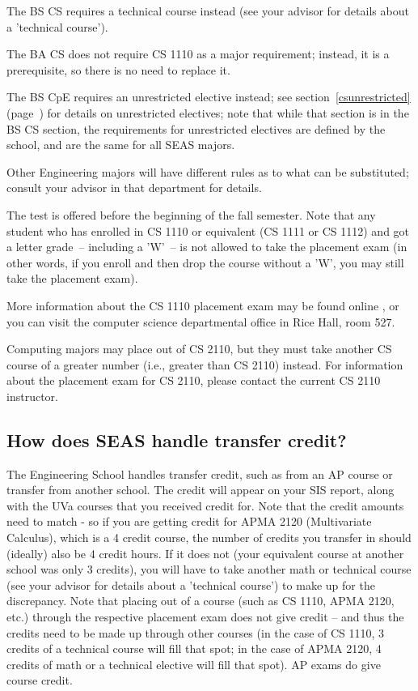 \begin{itemlist}
\item The BS CS requires a technical course instead (see your advisor
for details about a 'technical course').
\item The BA CS does not require CS 1110 as a major requirement;
  instead, it is a prerequisite, so there is no need to replace it.
\item The BS CpE requires an unrestricted elective instead; see
section~\ref{csunrestricted} (page~\pageref{csunrestricted}) for
details on unrestricted electives; note that while that section is in
the BS CS section, the requirements for unrestricted electives are
defined by the school, and are the same for all SEAS majors.
\item Other Engineering majors will have different rules as to what
  can be substituted; consult your advisor in that department for
  details.
\end{itemlist}

The test is offered before the beginning of the fall semester. Note
that any student who has enrolled in CS 1110 or equivalent (CS 1111 or
CS 1112) and got a letter grade~-- including a 'W'~-- is not allowed
to take the placement exam (in other words, if you enroll and then
drop the course without a 'W', you may still take the placement
exam).

More information about the CS 1110 placement exam may be found online
, or you can
visit the computer science departmental office in Rice Hall, room 527.

Computing majors may place out of CS 2110, but they must take another
CS course of a greater number (i.e., greater than CS 2110) instead.
For information about the placement exam for CS 2110, please contact
the current CS 2110 instructor.

\subsection{How does SEAS handle transfer credit?}

The Engineering School handles transfer credit, such as from an AP
course or transfer from another school. The credit will appear on your
SIS report, along with the UVa courses that you received credit
for. Note that the credit amounts need to match - so if you are
getting credit for APMA 2120 (Multivariate Calculus), which is a
4 credit course, the number of credits you transfer in should
(ideally) also be 4 credit hours. If it does not (your equivalent
course at another school was only 3 credits), you will have to take
another math or technical course (see your advisor for details about a
'technical course') to make up for the discrepancy. Note that placing
out of a course (such as CS 1110, APMA 2120, etc.) through
the respective placement exam does not give credit – and thus the
credits need to be made up through other courses (in the case of CS
1110, 3 credits of a technical course will fill that spot; in
the case of APMA 2120, 4 credits of math or a technical elective
will fill that spot). AP exams do give course credit.

